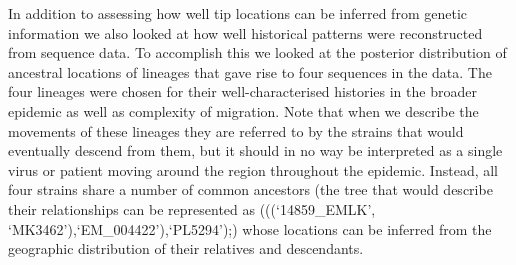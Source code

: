 \documentclass[11pt,oneside,letterpaper]{article}
\begin{document}
In addition to assessing how well tip locations can be inferred from genetic information we also looked at how well historical patterns were reconstructed from sequence data.
To accomplish this we looked at the posterior distribution of ancestral locations of lineages that gave rise to four sequences in the data.
The four lineages were chosen for their well-characterised histories in the broader epidemic as well as complexity of migration.
Note that when we describe the movements of these lineages they are referred to by the strains that would eventually descend from them, but it should in no way be interpreted as a single virus or patient moving around the region throughout the epidemic.
Instead, all four strains share a number of common ancestors (the tree that would describe their relationships can be represented as (((`14859\_EMLK', `MK3462'),`EM\_004422'),`PL5294');) whose locations can be inferred from the geographic distribution of their relatives and descendants.
\end{document}
